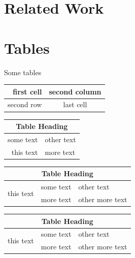 \documentclass[12pt,twoside,a4paper]{article}
\begin{document}
\lipsum[1-4]

\section{Related Work}
\singlespacing

\lipsum[5-6]

\section{Tables}

Some tables

\vspace{0.2in}

\begin{tabular}{| r | c |}
\hline
first cell & second column \\
\hline
second row & last cell \\
\hline
\end{tabular}

\vspace{0.2in}

\begin{table}[b]

	\begin{tabular}{ | r | l | }
    	\hline
    	\multicolumn{2}{|c|}{Table Heading} \\
    	\hline
    		some text & other text \\
			this text & more text \\
    	\hline
	\end{tabular}

\end{table}


\vspace{0.2in}

\begin{tabular}{ | r | c | l | }
    \hline
    \multicolumn{3}{|c|}{Table Heading} \\
\hline
    \multirow{2}{*}{this text} & some text & other text \\
     & more text & other more text \\
    \hline
\end{tabular}

\vspace{0.2in}

\begin{tabularx}{\textwidth}{ | X | X | X | }
    \hline
    \multicolumn{3}{|c|}{Table Heading} \\
\hline
    \multirow{2}{*}{this text} & some text & other text \\
     & more text & other more text \\
    \hline
\end{tabularx}
\end{document}
